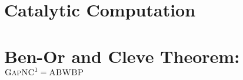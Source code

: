 \section{Catalytic Computation}

\section{Ben-Or and Cleve Theorem: $\textsc{GapNC}^1=\textsc{ABWBP}$}